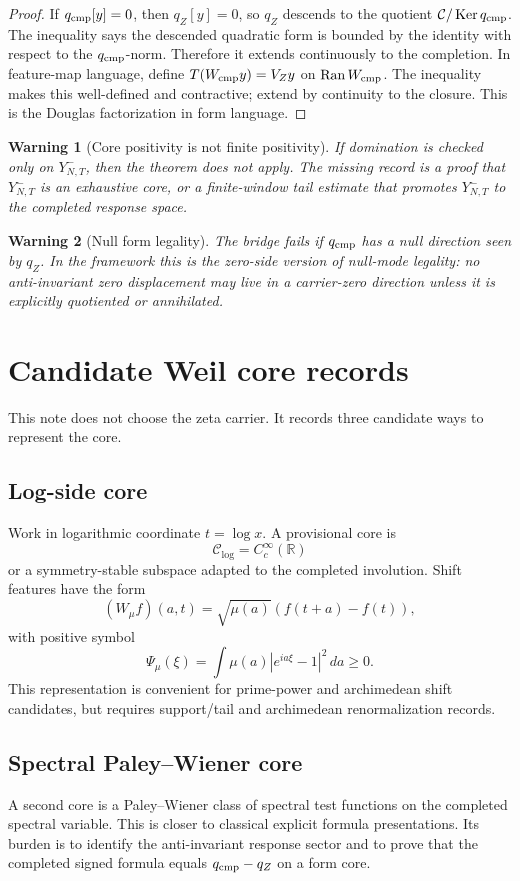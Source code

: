 \documentclass[11pt]{article}
\newtheorem{warning}{Warning}
\newcommand{\Yfin}{Y^-_{N,T}}
\newcommand{\Ran}{\operatorname{Ran}}
\newcommand{\Ker}{\operatorname{Ker}}
\begin{document}
\begin{proof}
If \(q_{\rm cmp}[y]=0\), then \(q_Z[y]=0\), so \(q_Z\) descends to the quotient \(\mathcal C/\Ker q_{\rm cmp}\).  The inequality says the descended quadratic form is bounded by the identity with respect to the \(q_{\rm cmp}\)-norm.  Therefore it extends continuously to the completion.  In feature-map language, define \(T(W_{\rm cmp}y)=V_Zy\) on \(\Ran W_{\rm cmp}\).  The inequality makes this well-defined and contractive; extend by continuity to the closure.  This is the Douglas factorization in form language.
\end{proof}

\begin{warning}[Core positivity is not finite positivity]
If domination is checked only on \(\Yfin\), then the theorem does not apply.  The missing record is a proof that \(\Yfin\) is an exhaustive core, or a finite-window tail estimate that promotes \(\Yfin\) to the completed response space.
\end{warning}

\begin{warning}[Null form legality]
The bridge fails if \(q_{\rm cmp}\) has a null direction seen by \(q_Z\).  In the framework this is the zero-side version of null-mode legality: no anti-invariant zero displacement may live in a carrier-zero direction unless it is explicitly quotiented or annihilated.
\end{warning}

\section{Candidate Weil core records}
This note does not choose the zeta carrier.  It records three candidate ways to represent the core.

\subsection{Log-side core}
Work in logarithmic coordinate \(t=\log x\).  A provisional core is
\[
  \mathcal C_{\log}=C_c^\infty(\mathbb R)
\]
or a symmetry-stable subspace adapted to the completed involution.  Shift features have the form
\[
  (W_\mu f)(a,t)=\sqrt{\mu(a)}(f(t+a)-f(t)),
\]
with positive symbol
\[
  \Psi_\mu(\xi)=\int \mu(a)|e^{ia\xi}-1|^2\,da\ge0.
\]
This representation is convenient for prime-power and archimedean shift candidates, but requires support/tail and archimedean renormalization records.

\subsection{Spectral Paley--Wiener core}
A second core is a Paley--Wiener class of spectral test functions on the completed spectral variable.  This is closer to classical explicit formula presentations.  Its burden is to identify the anti-invariant response sector and to prove that the completed signed formula equals \(q_{\rm cmp}-q_Z\) on a form core.
\end{document}
